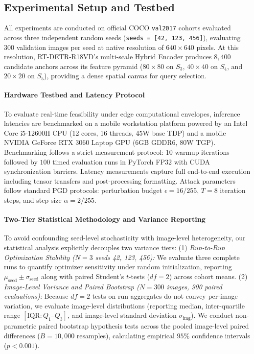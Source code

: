 \documentclass[preprint,12pt]{elsarticle}
\begin{document}
\subsection{Experimental Setup and Testbed}
All experiments are conducted on official COCO \texttt{val2017} cohorts evaluated across three independent random seeds (\texttt{seeds = [42, 123, 456]}), evaluating 300 validation images per seed at native resolution of $640 \times 640$ pixels. At this resolution, RT-DETR-R18VD's multi-scale Hybrid Encoder produces $8,400$ candidate anchors across its feature pyramid ($80\times 80$ on $S_3$, $40\times 40$ on $S_4$, and $20\times 20$ on $S_5$), providing a dense spatial canvas for query selection.

\paragraph{Hardware Testbed and Latency Protocol}
To evaluate real-time feasibility under edge computational envelopes, inference latencies are benchmarked on a mobile workstation platform powered by an Intel Core i5-12600H CPU (12 cores, 16 threads, 45W base TDP) and a mobile NVIDIA GeForce RTX 3060 Laptop GPU (6GB GDDR6, 80W TGP). Benchmarking follows a strict measurement protocol: $10$ warmup iterations followed by $100$ timed evaluation runs in PyTorch FP32 with CUDA synchronization barriers. Latency measurements capture full end-to-end execution including tensor transfers and post-processing formatting. Attack parameters follow standard PGD protocols: perturbation budget $\epsilon = 16/255$, $T = 8$ iteration steps, and step size $\alpha = 2/255$.

\paragraph{Two-Tier Statistical Methodology and Variance Reporting}
To avoid confounding seed-level stochasticity with image-level heterogeneity, our statistical analysis explicitly decouples two variance tiers:
(1) \textit{Run-to-Run Optimization Stability ($N=3$ seeds 42, 123, 456):} We evaluate three complete runs to quantify optimizer sensitivity under random initialization, reporting $\mu_{\mathrm{seed}} \pm \sigma_{\mathrm{seed}}$ along with paired Student's $t$-tests ($df = 2$) across cohort means.
(2) \textit{Image-Level Variance and Paired Bootstrap ($N=300$ images, 900 paired evaluations):} Because $df=2$ tests on run aggregates do not convey per-image variation, we evaluate image-level distributions (reporting median, inter-quartile range $[\mathrm{IQR}: Q_1\text{--}Q_3]$, and image-level standard deviation $\sigma_{\mathrm{img}}$). We conduct non-parametric paired bootstrap hypothesis tests across the pooled image-level paired differences ($B = 10{,}000$ resamples), calculating empirical $95\%$ confidence intervals ($p < 0.001$).
\end{document}
